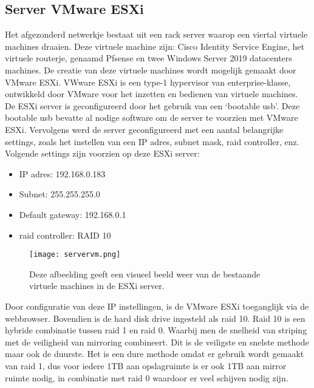 \subsection{Server VMware ESXi}
Het afgezonderd netwerkje bestaat uit een rack server waarop een viertal virtuele machines draaien. Deze virtuele machine zijn: Cisco Identity Service Engine, het virtuele routerje, genaamd Pfsense en twee  Windows Server 2019 datacenters machines. De creatie van deze virtuele machines wordt mogelijk gemaakt door VMware ESXi. VWware ESXi is een type-1 hypervisor van enterprise-klasse, ontwikkeld door VMware voor het inzetten en bedienen van virtuele machines. 
\newline
\newline
De ESXi server is geconfigureerd door het gebruik van een ‘bootable usb’. Deze bootable usb bevatte al nodige software om de server te voorzien met VMware ESXi. Vervolgens werd de server geconfigureerd met een aantal belangrijke settings, zoals het instellen van een IP adres, subnet mask, raid controller, enz.
\newline
\newline
Volgende settings zijn voorzien op deze ESXi server: 

\begin{itemize}
	\item IP adres: 192.168.0.183
	\item Subnet: 255.255.255.0
	\item Default gateway: 192.168.0.1
	\item raid controller: RAID 10
\end{itemize}

\begin{figure}[H]
	\centering
	\texttt{[image: servervm.png]}
	\caption{Deze afbeelding geeft een visueel beeld weer van de bestaande virtuele machines in de ESXi server.}
\end{figure}

\newpage
Door configuratie van deze IP instellingen, is de VMware ESXi toeganglijk via de webbrowser. Bovendien is de hard disk drive ingesteld als raid 10. Raid 10 is een hybride combinatie tussen raid 1 en raid 0. Waarbij men de snelheid van striping met de veiligheid van mirroring combineert. 
\newline
\newline
Dit is de veiligste en snelste methode maar ook de duurste. Het is een dure methode omdat er gebruik wordt gemaakt van raid 1, dus voor iedere 1TB aan opslagruimte is er ook 1TB aan mirror ruimte nodig, in combinatie met raid 0 waardoor er veel schijven nodig zijn. 

